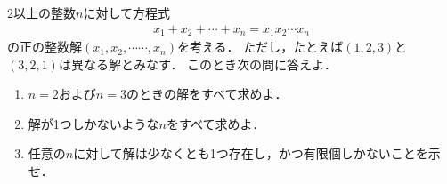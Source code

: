 \documentclass[../../main.tex]{subfiles}
\begin{document}
2以上の整数$n$に対して方程式
\begin{align}
  x_1+x_2+\cdots+x_n=x_1 x_2 \cdots x_n
\end{align}
の正の整数解$(x_1,x_2,\cdots\cdots,x_n)$を考える．
ただし，たとえば$(1,2,3)$と$(3,2,1)$は異なる解とみなす．
このとき次の問に答えよ．
\begin{enumerate}
  \item $n=2$および$n=3$のときの解をすべて求めよ．
  \item 解が1つしかないような$n$をすべて求めよ．
  \item 任意の$n$に対して解は少なくとも1つ存在し，かつ有限個しかないことを示せ．
\end{enumerate}
\end{document}
